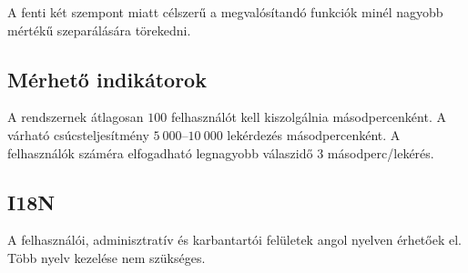 A fenti két szempont miatt célszerű a megvalósítandó funkciók minél nagyobb mértékű szeparálására törekedni.


\subsection{Mérhető indikátorok}\label{sec:indikatorok}
A rendszernek átlagosan $100$ felhasználót kell kiszolgálnia másodpercenként. A várható csúcsteljesítmény $5~000$--$10~000$ lekérdezés másodpercenként. A felhasználók száméra elfogadható legnagyobb válaszidő 3 másodperc/lekérés.


\subsection{I18N}
A felhasználói, adminisztratív és karbantartói felületek angol nyelven érhetőek el. Több nyelv kezelése nem szükséges.

